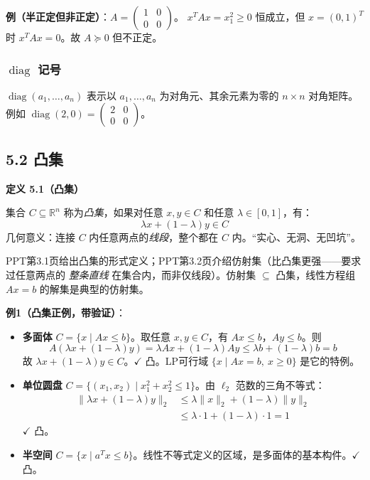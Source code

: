 \textbf{例（半正定但非正定）}：$A=\begin{pmatrix}1&0\\0&0\end{pmatrix}$。
$x^T A x = x_1^2 \ge 0$ 恒成立，但 $x=(0,1)^T$ 时 $x^T A x=0$。故 $A \succeq 0$ 但不正定。

\subsubsection{$\operatorname{diag}$ 记号}

$\operatorname{diag}(a_1,\dots,a_n)$ 表示以 $a_1,\dots,a_n$ 为对角元、其余元素为零的 $n\times n$ 对角矩阵。例如 $\operatorname{diag}(2,0)=\begin{pmatrix}2&0\\0&0\end{pmatrix}$。

\subsection{5.2 凸集}

\begin{defbox}
\textbf{定义 5.1（凸集）}

集合 $C \subseteq \mathbb{R}^n$ 称为\emph{凸集}，如果对任意 $x,y \in C$ 和任意 $\lambda \in [0,1]$，有：
\[
\lambda x + (1-\lambda) y \in C
\]
几何意义：连接 $C$ 内任意两点的\emph{线段}，整个都在 $C$ 内。“实心、无洞、无凹坑”。
\end{defbox}

\medskip
PPT第3.1页给出凸集的形式定义；PPT第3.2页介绍仿射集（比凸集更强——要求过任意两点的 \emph{整条直线} 在集合内，而非仅线段）。仿射集 $\subseteq$ 凸集，线性方程组 $Ax=b$ 的解集是典型的仿射集。
\medskip
{}
\medskip
{}
\medskip

\textbf{例1（凸集正例，带验证）}：
\begin{itemize}
  \item \textbf{多面体} $C = \{x \mid Ax \le b\}$。取任意 $x,y\in C$，有 $Ax\le b$，$Ay\le b$。则
  {\small
  \[
  A(\lambda x+(1-\lambda)y) = \lambda Ax + (1-\lambda)Ay \le \lambda b + (1-\lambda)b = b
  \]
  }
  故 $\lambda x+(1-\lambda)y \in C$。$\checkmark$ 凸。LP可行域 $\{x\mid Ax=b,\ x\ge 0\}$ 是它的特例。

  \item \textbf{单位圆盘} $C = \{(x_1,x_2) \mid x_1^2+x_2^2 \le 1\}$。由 $\ell_2$ 范数的三角不等式：
  \[
  \begin{aligned}
  \|\lambda x+(1-\lambda)y\|_2
  &\le \lambda\|x\|_2 + (1-\lambda)\|y\|_2 \\
  &\le \lambda\cdot 1 + (1-\lambda)\cdot 1 = 1
  \end{aligned}
  \]
  $\checkmark$ 凸。

  \item \textbf{半空间} $C = \{x \mid a^T x \le b\}$。线性不等式定义的区域，是多面体的基本构件。$\checkmark$ 凸。
\end{itemize}

